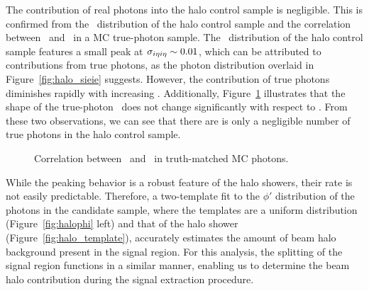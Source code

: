 The contribution of real photons into the halo control sample is negligible.
This is confirmed from the \sieie\ distribution of the halo control sample and the correlation between \sieie\ and \emip\ in a MC true-photon sample.
The \sieie\ distribution of the halo control sample features a small peak at $\sigma_{i\eta i\eta} \sim 0.01$, which can be attributed to contributions from true photons, as the photon \sieie distribution overlaid in Figure~\ref{fig:halo_sieie} suggests. 
However, the contribution of true photons diminishes rapidly with increasing \sieie. 
Additionally, Figure~\ref{fig:sieie_mip_corr} illustrates that the shape of the true-photon \sieie\ does not change significantly with respect to \emip. 
From these two observations, we can see that there are is only a negligible number of true photons in the halo control sample.

\begin{figure}[htbp]
  \centering
  \caption{
    Correlation between \sieie\ and \emip\ in truth-matched MC photons. 
  }
  \label{fig:sieie_mip_corr}
\end{figure}

While the peaking behavior is a robust feature of the halo showers, their rate is not easily predictable. 
Therefore,  a two-template fit to the $\phi'$ distribution of the photons in the candidate sample, where the templates are a uniform distribution (Figure~\ref{fig:halophi} left) and that of the halo shower (Figure~\ref{fig:halo_template}), accurately estimates the amount of beam halo background present in the signal region. 
For this analysis, the splitting of the signal region functions in a similar manner, enabling us to determine the beam halo contribution during the signal extraction procedure.

